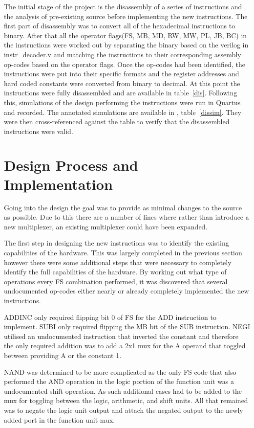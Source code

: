 \documentclass[12pt,letterpaper,titlepage]{article}
\begin{document}
\begin{raggedright}
The initial stage of the project is the disassembly of a series of instructions and the analysis of pre-existing source before implementing the new instructions. The first part of disassembly was to convert all of the hexadecimal instructions to binary. After that all the operator flags(FS, MB, MD, RW, MW, PL, JB, BC) in the instructions were worked out by separating the binary based on the verilog in instr\_decoder.v and matching the instructions to their corresponding assembly op-codes based on the operator flags. Once the op-codes had been identified, the instructions were put into their specific formats and the register addresses and hard coded constants were converted from binary to decimal. At this point the instructions were fully disassembled and are available in table~\ref{dis}. Following this, simulations of the design performing the instructions were run in Quartus and recorded. The annotated simulations are available in , table~\ref{dissim}. They were then cross-referenced against the table to verify that the disassembled instructions were valid.

\pagebreak

\section{Design Process and Implementation}
Going into the design the goal was to provide as minimal changes to the source as possible. Due to this there are a number of lines where rather than introduce a new multiplexer, an existing multiplexer could have been expanded.

The first step in designing the new instructions was to identify the existing capabilities of the hardware. This was largely completed in the previous section however there were some additional steps that were necessary to completely identify the full capabilities of the hardware. By working out what type of operations every FS combination performed, it was discovered that several undocumented op-codes either nearly or already completely implemented the new instructions. 

ADDINC only required flipping bit 0 of FS for the ADD instruction to implement. SUBI only required flipping the MB bit of the SUB instruction. NEGI utilised an undocumented instruction that inverted the constant and therefore the only required addition was to add a 2x1 mux for the A operand that toggled between providing A or the constant 1. 

NAND was determined to be more complicated as the only FS code that also performed the AND operation in the logic portion of the function unit was a undocumented shift operation. As such additional cases had to be added to the mux for toggling between the logic, arithmetic, and shift units. All that remained was to negate the logic unit output and attach the negated output to the newly added port in the function unit mux. 


\end{raggedright}
\end{document}
